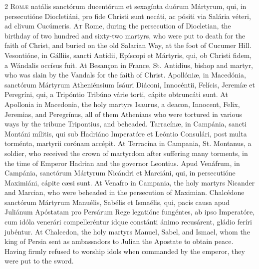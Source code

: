 \begin{paracol}{2}
\lettrine[lines=2]{R}{omæ} natális sanctórum 
 ducentórum et sexagínta duórum Mártyrum, qui, in persecutióne Diocletiáni, 
 pro fide Christi sunt necáti, ac pósiti via Salária véteri, ad clivum 
 Cucúmeris.
\switchcolumn
{}
\lettrine[lines=2]{A}{t} Rome, during the persecution of 
 Diocletian, the birthday of two hundred and sixty-two martyrs, who were put 
 to death for the faith of Christ, and buried on the old Salarian Way, at the 
 foot of Cucumer Hill.
\switchcolumn*
{}
Vesontióne, in Gálliis, 
 sancti Antídii, Epíscopi et Mártyris, qui, ob Christi fidem, a Wándalis 
 occísus fuit.
\switchcolumn
{}
At Besançon in France, St. Antidius, 
 bishop and martyr, who was slain by the Vandals for the faith of Christ.
\switchcolumn*
{}
Apollóniæ, in 
 Macedónia, sanctórum Mártyrum Atheniénsium Isáuri Diáconi, Innocéntii, 
 Felícis, Jeremíæ et Peregríni, qui, a Tripóntio Tribúno várie torti, cápite 
 obtruncáti sunt.
\switchcolumn
{}
At Apollonia in Macedonia, the holy 
 martyrs Isaurus, a deacon, Innocent, Felix, Jeremias, and Peregrínus, all of 
 them Athenians who were tortured in various ways by the tribune Tripontius, 
 and beheaded.
\switchcolumn*
{}
Tarracínæ, in Campánia, 
 sancti Montáni mílitis, qui sub Hadriáno Imperatóre et Leóntio Consulári, 
 post multa torménta, martyrii corónam accépit.
\switchcolumn
{}
At Terracina in Campania, St. 
 Montanus, a soldier, who received the crown of martyrdom after suffering 
 many torments, in the time of Emperor Hadrian and the governor Leontius.
\switchcolumn*
{}
Apud Venáfrum, in 
 Campánia, sanctórum Mártyrum Nicándri et Marciáni, qui, in persecutióne 
 Maximiáni, cápite cæsi sunt.
\switchcolumn
{}
At Venafro in Campania, the holy 
 martyrs Nicander and Marcian, who were beheaded in the persecution of 
 Maximian.
\switchcolumn*
{}
Chalcédone sanctórum 
 Mártyrum Manuélis, Sabélis et Ismaélis, qui, pacis causa apud Juliánum 
 Apóstatam pro Persárum Rege legatióne fungéntes, ab ipso Imperatóre, cum 
 idóla venerári compelleréntur idque constánti ánimo recusárent, gládio 
 feríri jubéntur.
\switchcolumn
{}
At Chalcedon, the holy martyrs 
 Manuel, Sabel, and Ismael, whom the king of Persia sent as ambassadors to 
 Julian the Apostate to obtain peace. Having firmly refused to worship 
 idols when commanded by the emperor, they were put to the sword.

\end{paracol}
